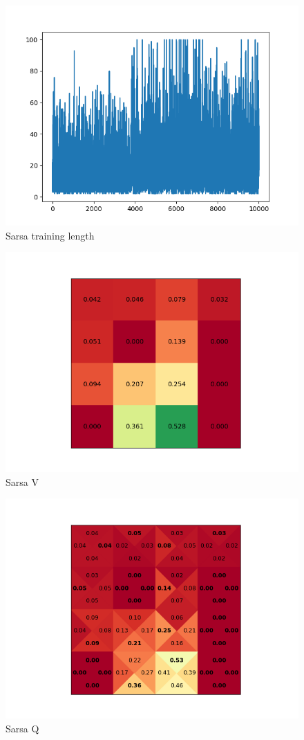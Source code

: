 \documentclass[a4paper]{article}
\begin{document}
\begin{figure}
	\centering
	\includegraphics[width=0.8\linewidth]{4x4_sarsa_length}
	\caption{Sarsa training length}
	\label{fig:sarsalength}
\end{figure}
\begin{figure}
	\centering
	\includegraphics[width=0.6\linewidth]{4x4_sarsa_v}
	\caption{Sarsa V}
	\label{fig:sarsareward}
\end{figure}
\begin{figure}
	\centering
	\includegraphics[width=0.6\linewidth]{4x4_sarsa_q}
	\caption{Sarsa Q}
	\label{fig:sarsapolicy}
\end{figure}
\end{document}
